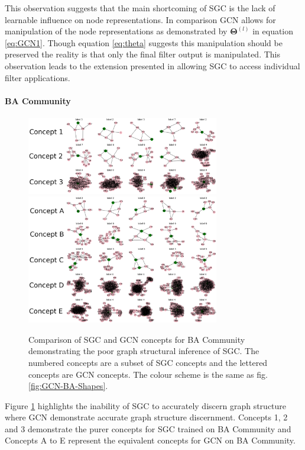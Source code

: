 This observation suggests that the main shortcoming of SGC is the lack of learnable influence on node representations.
In comparison GCN allows for manipulation of the node representations as demonstrated by $\bm{\Theta}^{(l)}$ in equation \ref{eq:GCN1}.
Though equation \ref{eq:theta} suggests this manipulation should be preserved the reality is that only the final filter output is manipulated.
This observation leads to the extension presented in  allowing SGC to access individual filter applications.

\paragraph{BA Community}
\begin{figure}
    \centering
    \includegraphics[width=0.75\textwidth]{figures/SGC-BA-Community}
    \includegraphics[width=0.75\textwidth]{figures/GCN-BA-Community}
    \caption{Comparison of SGC and GCN concepts for BA Community demonstrating the poor graph structural inference of SGC. The numbered concepts are a subset of SGC concepts and the lettered concepts are GCN concepts. The colour scheme is the same as fig. \ref{fig:GCN-BA-Shapes}.}
    \label{fig:BA-Community}
\end{figure}

Figure \ref{fig:BA-Community} highlights the inability of SGC to accurately discern graph structure where GCN demonstrate accurate graph structure discernment.
Concepts 1, 2 and 3 demonstrate the purer concepts for SGC trained on BA Community and Concepts A to E represent the equivalent concepts for GCN on BA Community.

